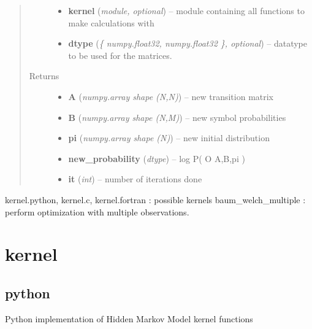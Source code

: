 \documentclass[letterpaper,10pt,english]{sphinxmanual}
\begin{document}
\begin{fulllineitems}
\begin{quote}
\begin{description}
\begin{itemize}
\item {} 
\textbf{kernel} (\emph{module, optional}) --
module containing all functions to make calculations with

\item {} 
\textbf{dtype} (\emph{\{ numpy.float32, numpy.float32 \}, optional}) --
datatype to be used for the matrices.

\end{itemize}

\item[{Returns}] \leavevmode
\begin{itemize}
\item {} 
\textbf{A} (\emph{numpy.array shape (N,N)}) --
new transition matrix

\item {} 
\textbf{B} (\emph{numpy.array shape (N,M)}) --
new symbol probabilities

\item {} 
\textbf{pi} (\emph{numpy.array shape (N)}) --
new initial distribution

\item {} 
\textbf{new\_probability} (\emph{dtype}) --
log P( O \textbar{} A,B,pi )

\item {} 
\textbf{it} (\emph{int}) --
number of iterations done

\end{itemize}


\end{description}\end{quote}




kernel.python, kernel.c, kernel.fortran : possible kernels
baum\_welch\_multiple : perform optimization with multiple observations.



\end{fulllineitems}



\section{kernel}
\label{hmm:kernel}

\subsection{python}
\label{hmm:python}\label{hmm:module-kernel.python}
Python implementation of Hidden Markov Model kernel functions
\end{document}
